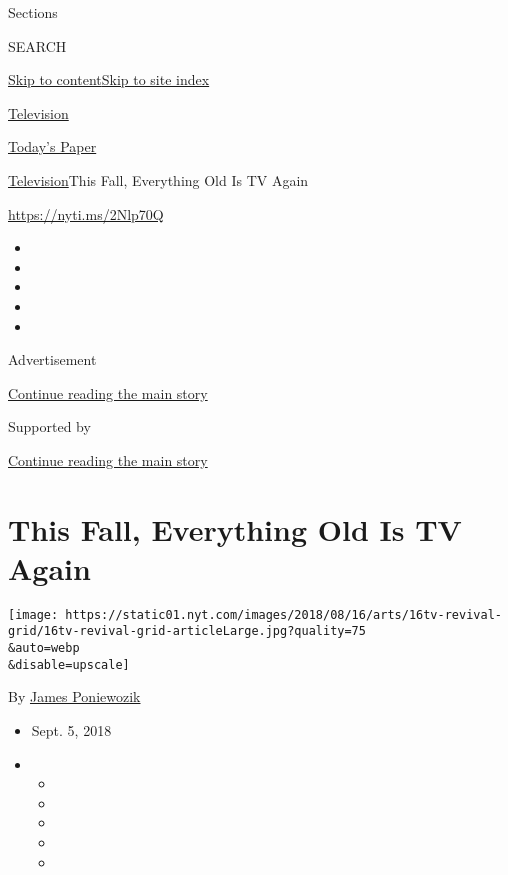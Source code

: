 Sections

SEARCH

\protect\hyperlink{site-content}{Skip to
content}\protect\hyperlink{site-index}{Skip to site index}

\href{https://www.nytimes.com/section/arts/television}{Television}

\href{https://myaccount.nytimes.com/auth/login?response_type=cookie\&client_id=vi}{}

\href{https://www.nytimes.com/section/todayspaper}{Today's Paper}

\href{/section/arts/television}{Television}\textbar{}This Fall,
Everything Old Is TV Again

\href{https://nyti.ms/2Nlp70Q}{https://nyti.ms/2Nlp70Q}

\begin{itemize}
\item
\item
\item
\item
\item
\end{itemize}

Advertisement

\protect\hyperlink{after-top}{Continue reading the main story}

Supported by

\protect\hyperlink{after-sponsor}{Continue reading the main story}

\hypertarget{this-fall-everything-old-is-tv-again}{%
\section{This Fall, Everything Old Is TV
Again}\label{this-fall-everything-old-is-tv-again}}

\texttt{[image: https://static01.nyt.com/images/2018/08/16/arts/16tv-revival-grid/16tv-revival-grid-articleLarge.jpg?quality=75\\\&auto=webp\\\&disable=upscale]}

By \href{https://www.nytimes.com/by/james-poniewozik}{James Poniewozik}

\begin{itemize}
\item
  Sept. 5, 2018
\item
  \begin{itemize}
  \item
  \item
  \item
  \item
  \item
  \end{itemize}
\end{itemize}

